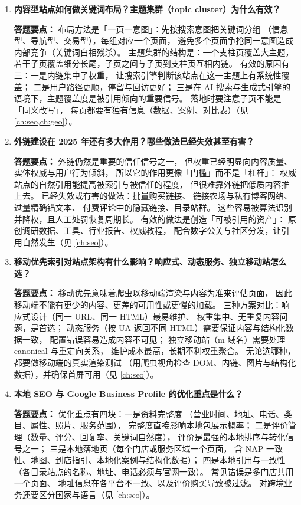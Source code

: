 \begin{interview}[题库与答题要点]
\begin{enumerate}[label=]
  \item[\textcolor{VioletDeep}{\textbf{Q84.}}] \textbf{内容型站点如何做关键词布局？主题集群（topic cluster）为什么有效？}
\par\smallskip\noindent\textcolor{VioletDeep}{\textbf{答题要点：}}
布局方法是「一页一意图」：先按搜索意图把关键词分组
（信息型、导航型、交易型），每组对应一个页面，
避免多个页面争抢同一意图造成内部竞争（关键词自相残杀）。
主题集群的结构是：一个支柱页覆盖大主题，
若干子页覆盖细分长尾，子页之间与子页到支柱页互相内链。
有效的原因有三：一是内链集中了权重，
让搜索引擎判断该站点在这一主题上有系统性覆盖；
二是用户路径更顺，停留与回访更好；
三是在 AI 搜索与生成式引擎的语境下，主题覆盖度是被引用倾向的重要信号。
落地时要注意子页不能是「同义改写」，
每页都要有独有信息（数据、案例、对比表）（见 \cref{ch:seo,ch:geo}）。

  \item[\textcolor{VioletDeep}{\textbf{Q85.}}] \textbf{外链建设在 2025 年还有多大作用？哪些做法已经失效甚至有害？}
\par\smallskip\noindent\textcolor{VioletDeep}{\textbf{答题要点：}}
外链仍然是重要的信任信号之一，
但权重已经明显向内容质量、实体权威与用户行为倾斜，
所以它的作用更像「门槛」而不是「杠杆」：
权威站点的自然引用能提高被索引与被信任的程度，
但很难靠外链把低质内容推上去。
已经失效或有害的做法：批量购买链接、
链接农场与私有博客网络、过量精确锚文本、
付费评论中的隐藏链接、目录站群。
这些容易被算法识别并降权，且人工处罚恢复周期长。
有效的做法是创造「可被引用的资产」：
原创调研数据、工具、行业报告、权威教程，
配合数字公关与社区分发，让引用自然发生（见 \cref{ch:seo}）。

  \item[\textcolor{VioletDeep}{\textbf{Q86.}}] \textbf{移动优先索引对站点架构有什么影响？响应式、动态服务、独立移动站怎么选？}
\par\smallskip\noindent\textcolor{VioletDeep}{\textbf{答题要点：}}
移动优先意味着爬虫以移动端渲染与内容为准来评估页面，
因此移动端不能有更少的内容、更差的可用性或更慢的加载。
三种方案对比：响应式设计（同一 URL、同一 HTML）最易维护、
权重集中、无重复内容问题，是首选；
动态服务（按 UA 返回不同 HTML）需要保证内容与结构化数据一致，
配置错误容易造成内容不可见；
独立移动站（m 域名）需要处理 canonical 与重定向关系，
维护成本最高，长期不利权重聚合。
无论选哪种，都要做移动端的真实渲染测试
（用爬虫视角检查 DOM、内链、图片与结构化数据），并确保首屏可用（见 \cref{ch:seo}）。

  \item[\textcolor{VioletDeep}{\textbf{Q87.}}] \textbf{本地 SEO 与 Google Business Profile 的优化重点是什么？}
\par\smallskip\noindent\textcolor{VioletDeep}{\textbf{答题要点：}}
优化重点有四块：一是资料完整度
（营业时间、地址、电话、类目、属性、照片、服务范围），
完整度直接影响本地包展示概率；
二是评价管理（数量、评分、回复率、关键词自然度），
评价是最强的本地排序与转化信号之一；
三是本地落地页（每个门店或服务区域一个页面，
含 NAP 一致性、地图、到店指引、本地化案例与结构化数据）；
四是本地引用与一致性（各目录站点的名称、地址、电话必须与官网一致）。
常见错误是多门店共用一个页面、
地址信息在各平台不一致、以及评价购买导致被过滤。
对跨境业务还要区分国家与语言（见 \cref{ch:seo}）。


\end{enumerate}
\end{interview}
